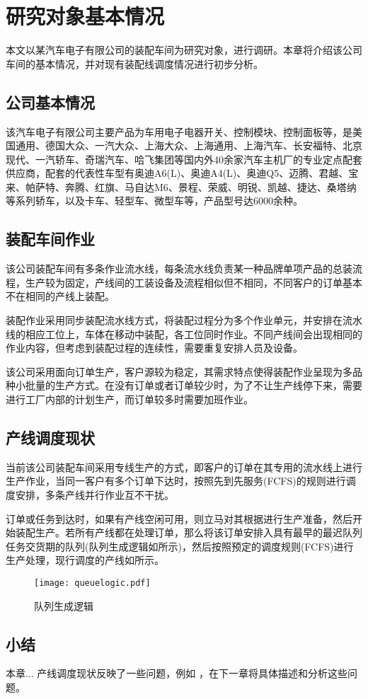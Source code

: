 \chapter{研究对象基本情况}
本文以某汽车电子有限公司的装配车间为研究对象，进行调研。本章将介绍该公司车间的基本情况，并对现有装配线调度情况进行初步分析。
\section{公司基本情况}
该汽车电子有限公司主要产品为车用电子电器开关、控制模块、控制面板等，是美国通用、德国大众、一汽大众、上海大众、上海通用、上海汽车、长安福特、北京现代、一汽轿车、奇瑞汽车、哈飞集团等国内外40余家汽车主机厂的专业定点配套供应商，配套的代表性车型有奥迪A6(L)、奥迪A4(L)、奥迪Q5、迈腾、君越、宝来、帕萨特、奔腾、红旗、马自达M6、景程、荣威、明锐、凯越、捷达、桑塔纳等系列轿车，以及卡车、轻型车、微型车等，产品型号达6000余种。

\section{装配车间作业}
该公司装配车间有多条作业流水线，每条流水线负责某一种品牌单项产品的总装流程，生产较为固定，产线间的工装设备及流程相似但不相同，不同客户的订单基本不在相同的产线上装配。

装配作业采用同步装配流水线方式，将装配过程分为多个作业单元，并安排在流水线的相应工位上，车体在移动中装配，各工位同时作业。不同产线间会出现相同的作业内容，但考虑到装配过程的连续性，需要重复安排人员及设备。

该公司采用面向订单生产，客户源较为稳定，其需求特点使得装配作业呈现为多品种小批量的生产方式。在没有订单或者订单较少时，为了不让生产线停下来，需要进行工厂内部的计划生产，而订单较多时需要加班作业。

\section{产线调度现状}
当前该公司装配车间采用专线生产的方式，即客户的订单在其专用的流水线上进行生产作业，当同一客户有多个订单下达时，按照先到先服务(FCFS)的规则进行调度安排，多条产线并行作业互不干扰。

订单或任务到达时，如果有产线空闲可用，则立马对其根据进行生产准备，然后开始装配生产。若所有产线都在处理订单，那么将该订单安排入具有最早的最迟队列任务交货期的队列(队列生成逻辑如所示)，然后按照预定的调度规则(FCFS)进行生产处理，现行调度的产线如{}所示。
\begin{figure}[h]
\centering
\texttt{[image: queuelogic.pdf]}
\caption{队列生成逻辑\label{fig:queuelog}}
\end{figure}

\section{小结}
本章...
产线调度现状反映了一些问题，例如 ，在下一章将具体描述和分析这些问题。